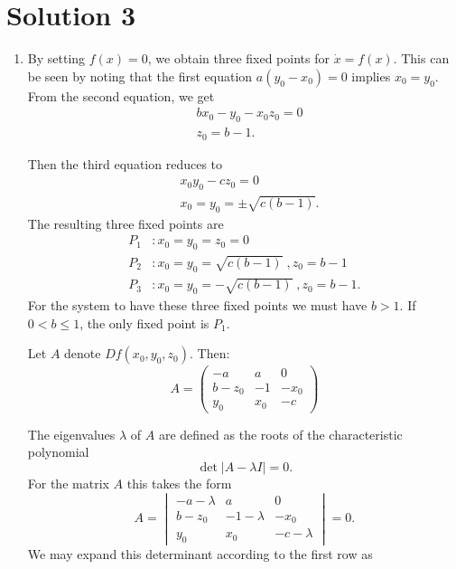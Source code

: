 \documentclass[twoside,10pt,a4paper]{article}
\begin{document}
\section*{Solution 3}
\begin{enumerate}[label=(\alph*)]
\item By setting $f(x)=0$, we obtain three fixed points for $\dot{x} = f(x)$. This can be seen by noting that the first equation $a(y_0 - x_0)=0$ implies $x_0 = y_0$. From the second equation, we get
\begin{align*}
        &bx_0 - y_0 -x_0 z_0 = 0 \\
	&z_0 = b-1.
\end{align*}

Then the third equation reduces to
\begin{align*}
        &x_0y_0 - cz_0 = 0\\
        	&x_0=y_0 = \pm \sqrt{c(b-1)}.
\end{align*}
The resulting three fixed points are
\begin{align*}
	P_1 &: x_0 = y_0 = z_0 = 0\\
	P_2 &: x_0 = y_0 = \sqrt{c(b-1)} \;, z_0 = b-1 \\
	P_3 &: x_0 = y_0 = -\sqrt{c(b-1)} \;, z_0 = b-1.
\end{align*}
For the system to have these three fixed points we must have $\boxed{b>1}$. If $0<b\leq1$, the only fixed point is $P_1$.

Let $A$ denote $Df(x_0,y_0,z_0)$. Then:
\begin{equation*}
	A = \begin{pmatrix}
		-a & a & 0 \\
		b-z_0 & -1 & -x_0 \\
		y_0 & x_0 & -c
	\end{pmatrix}
\end{equation*}

The eigenvalues $\lambda$ of $A$ are defined as the roots of the characteristic polynomial
$$
\det |A - \lambda I |=0.
$$
For the matrix $A$ this takes the form
\begin{equation*}
	A = \begin{vmatrix}
		-a-\lambda & a & 0 \\
		b-z_0 & -1-\lambda & -x_0 \\
		y_0 & x_0 & -c-\lambda
	\end{vmatrix} = 0.
\end{equation*}
We may expand this determinant according to the first row as


\end{enumerate}
\end{document}
